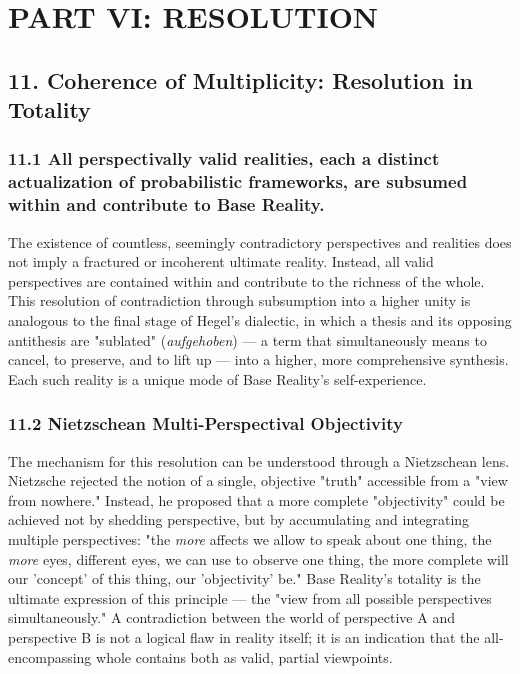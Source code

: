 \section*{PART VI: RESOLUTION}


\subsection*{11. Coherence of Multiplicity: Resolution in Totality}


\subsubsection*{11.1 All perspectivally valid realities, each a distinct actualization of probabilistic frameworks, are subsumed within and contribute to Base Reality.}


The existence of countless, seemingly contradictory perspectives and realities does not imply a fractured or incoherent ultimate reality. Instead, all valid perspectives are contained within and contribute to the richness of the whole. This resolution of contradiction through subsumption into a higher unity is analogous to the final stage of Hegel's dialectic, in which a thesis and its opposing antithesis are "sublated" (\textit{aufgehoben}) — a term that simultaneously means to cancel, to preserve, and to lift up — into a higher, more comprehensive synthesis. Each such reality is a unique mode of Base Reality's self-experience.


\subsubsection*{11.2 Nietzschean Multi-Perspectival Objectivity}


The mechanism for this resolution can be understood through a Nietzschean lens. Nietzsche rejected the notion of a single, objective "truth" accessible from a "view from nowhere." Instead, he proposed that a more complete "objectivity" could be achieved not by shedding perspective, but by accumulating and integrating multiple perspectives: "the \textit{more} affects we allow to speak about one thing, the \textit{more} eyes, different eyes, we can use to observe one thing, the more complete will our 'concept' of this thing, our 'objectivity' be." Base Reality's totality is the ultimate expression of this principle — the "view from all possible perspectives simultaneously." A contradiction between the world of perspective A and perspective B is not a logical flaw in reality itself; it is an indication that the all-encompassing whole contains both as valid, partial viewpoints.


